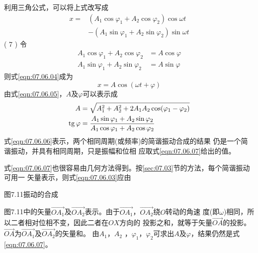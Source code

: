 利用三角公式，可以将上式改写成
\begin{equation}\label{eqn:07.06.04}
	\begin{aligned}
		x =& ( A _ { 1 } \cos \varphi _ { 1 } + A _ { 2 } \cos \varphi _ { 2 } ) \cos \omega t \\
		&- ( A _ { 1 } \sin \varphi _ { 1 } + A _ { 2 } \sin \varphi _ { 2 } ) \sin \omega t
	\end{aligned}
\end{equation}
( 7   )
令
\begin{equation}\label{eqn:07.06.05}
	\begin{aligned}
		A _ { 1 } \cos \varphi _ { 1 } + A _ { 2 } \cos \varphi _ { 2 } &= A  \cos \varphi  \\
		A _ { 1 } \sin \varphi _ { 1 } + A _ { 2 }  \sin \varphi _ { 2 } &= A  \sin \varphi
	\end{aligned}
\end{equation}
则式\eqref{eqn:07.06.04}成为
\begin{equation}\label{eqn:07.06.06}
	x = A  \cos ( \omega t +  \varphi )
\end{equation}
由式\ref{eqn:07.06.05}，$ A $及$ \varphi $可以表示成
\begin{equation}\label{eqn:07.06.07}
    \begin{split}
    A &= \sqrt { A _ { 1 } ^ { 2 } + A _ 2 ^ { 2 } + 2 A _ { 1 } A _ { 2 }  \cos ( \varphi _ { 1 } -  \varphi _ { 2 } ) } \\
    \operatorname{tg} \varphi &= \frac { A _ { 1 }  \sin \varphi _ { 1 } + A _ { 2 } \sin \varphi _ { 2 } } { A _ { 1 }  \cos \varphi _ { 1 } + A _ { 2 } \cos \varphi _ { 2 } }
    \end{split}
\end{equation}
式\eqref{eqn:07.06.06}表示，两个相同周期(或频率)的简谐振动合成的结果
仍是一个简谐振动，并具有相同周期，只是振幅和位相
应取式\eqref{eqn:07.06.07}给出的值。

式\eqref{eqn:07.06.07}也很容易由几何方法得到。按\ref{sec:07.03}节的方法，每个简谐振动可用一
矢量表示，则式\eqref{eqn:07.06.03}应由

图7.11振动的合成

图7.11中的矢量$ \vec{OA_1} $及$ \vec{OA_2} $表示。由于$ \vec{ O A _ { 1 } } $，$ \vec{ O A _ { 2 } } $绕$ O $转动的角速
度(即$ \omega $)相同，所以二者相对位相不变，因此二者在$ OX $方向的
投影之和，就等于矢量$\vec{OA}$的投影。$ \vec{OA} $为$\vec{OA_1}$及$\vec{OA_2}$的矢量和。
由$  A _ { 1 }   $，$  A _ { 2 }  $ ，$\varphi_{ 1 }$，$\varphi_{ 2 }$可求出$ A $及$\varphi$，结果仍然是式\eqref{eqn:07.06.07}。

